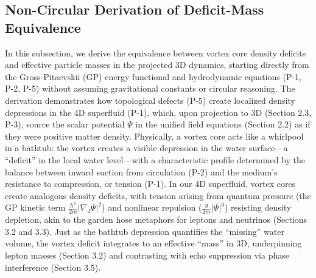 
\subsection{Non-Circular Derivation of Deficit-Mass Equivalence}

In this subsection, we derive the equivalence between vortex core density deficits and effective particle masses in the projected 3D dynamics, starting directly from the Gross-Pitaevskii (GP) energy functional and hydrodynamic equations (P-1, P-2, P-5) without assuming gravitational constants or circular reasoning. The derivation demonstrates how topological defects (P-5) create localized density depressions in the 4D superfluid (P-1), which, upon projection to 3D (Section 2.3, P-3), source the scalar potential $\Psi$ in the unified field equations (Section 2.2) as if they were positive matter density. Physically, a vortex core acts like a whirlpool in a bathtub: the vortex creates a visible depression in the water surface---a ``deficit'' in the local water level---with a characteristic profile determined by the balance between inward suction from circulation (P-2) and the medium's resistance to compression, or tension (P-1). In our 4D superfluid, vortex cores create analogous density deficits, with tension arising from quantum pressure (the GP kinetic term $\frac{\hbar^2}{2m} |\nabla_4 \Psi|^2$) and nonlinear repulsion ($\frac{g}{2m} |\Psi|^4$) resisting density depletion, akin to the garden hose metaphors for leptons and neutrinos (Sections 3.2 and 3.3). Just as the bathtub depression quantifies the ``missing'' water volume, the vortex deficit integrates to an effective ``mass'' in 3D, underpinning lepton masses (Section 3.2) and contrasting with echo suppression via phase interference (Section 3.5).

